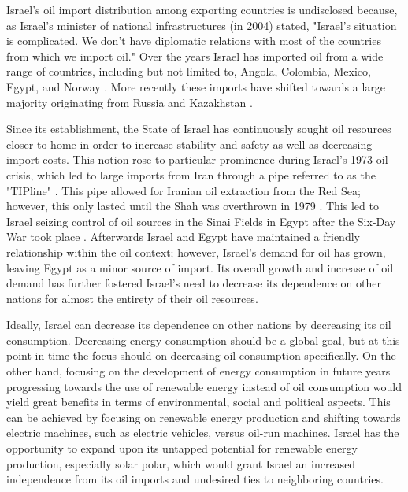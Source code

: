 \documentclass{report}                         %
\begin{document}
Israel's oil import distribution among exporting countries is undisclosed because, as Israel's minister of national infrastructures (in 2004) stated, "Israel's situation is complicated. We don't have diplomatic relations with most of the countries from which we import oil." \cite{Engber2006WhereOil} Over the years Israel has imported oil from a wide range of countries, including but not limited to, Angola, Colombia, Mexico, Egypt, and Norway \cite{Engber2006WhereOil}. More recently these imports have shifted towards a large majority originating from Russia and Kazakhstan \cite{Engber2006WhereOil}. 
	
Since its establishment, the State of Israel has continuously sought oil resources closer to home in order to increase stability and safety as well as decreasing import costs. This notion rose to particular prominence during Israel's 1973 oil crisis, which led to large imports from Iran through a pipe referred to as the "TIPline" \cite{Engber2006WhereOil}. This pipe allowed for Iranian oil extraction from the Red Sea; however, this only lasted until the Shah was overthrown in 1979 \cite{Engber2006WhereOil}. This led to Israel seizing control of oil sources in the Sinai Fields in Egypt after the Six-Day War took place \cite{Engber2006WhereOil}.  Afterwards Israel and Egypt have maintained a friendly relationship within the oil context; however, Israel's demand for oil has grown, leaving Egypt as a minor source of import. Its overall growth and increase of oil demand has further fostered Israel's need to decrease its dependence on other nations for almost the entirety of their oil resources. 

Ideally, Israel can decrease its dependence on other nations by decreasing its oil consumption. Decreasing energy consumption should be a global goal, but at this point in time the focus should on decreasing oil consumption specifically. On the other hand, focusing on the development of energy consumption in future years progressing towards the use of renewable energy instead of oil consumption would yield great benefits in terms of environmental, social and political aspects. This can be achieved by focusing on renewable energy production and shifting towards electric machines, such as electric vehicles, versus oil-run machines. Israel has the opportunity to expand upon its untapped potential for renewable energy production, especially solar polar, which would grant Israel an increased independence from its oil imports and undesired ties to neighboring countries. 
\end{document}
